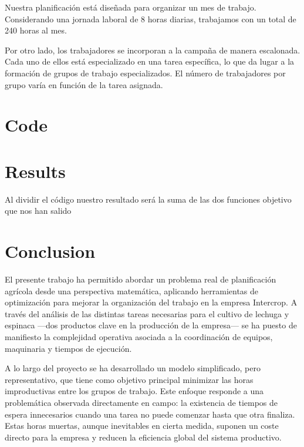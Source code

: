 



















Nuestra planificación está diseñada para organizar un mes de trabajo. Considerando una jornada laboral de 8 horas diarias, 
trabajamos con un total de 240 horas al mes.

Por otro lado, los trabajadores se incorporan a la campaña de manera escalonada. Cada uno de ellos está especializado en una 
tarea específica, lo que da lugar a la formación de grupos de trabajo especializados. El número de trabajadores por grupo varía 
en función de la tarea asignada.



\chapter*{Code}

\chapter*{Results}
Al dividir el código nuestro resultado será la suma de las dos funciones objetivo que nos han salido

\chapter*{Conclusion}
El presente trabajo ha permitido abordar un problema real de planificación agrícola desde una perspectiva matemática,
aplicando herramientas de optimización para mejorar la organización del trabajo en la empresa Intercrop.
A través del análisis de las distintas tareas necesarias para el cultivo de lechuga y espinaca —dos productos clave en la producción de la empresa—
se ha puesto de manifiesto la complejidad operativa asociada a la coordinación de equipos, maquinaria y tiempos de ejecución.

A lo largo del proyecto se ha desarrollado un modelo simplificado, pero representativo,
que tiene como objetivo principal minimizar las horas improductivas entre los grupos de trabajo.
Este enfoque responde a una problemática observada directamente en campo:
la existencia de tiempos de espera innecesarios cuando una tarea no puede comenzar hasta que otra finaliza.
Estas horas muertas, aunque inevitables en cierta medida, suponen un coste directo para la empresa y reducen la eficiencia global del sistema productivo.

